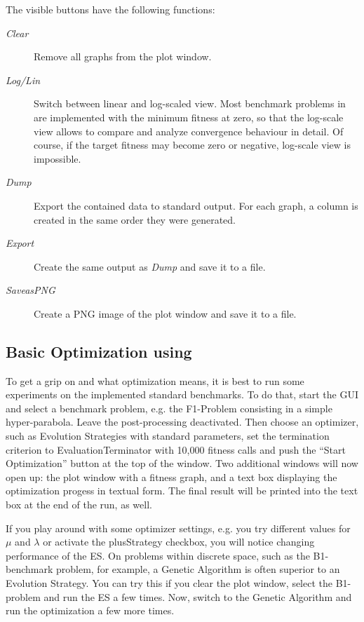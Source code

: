 The visible buttons have the following functions:
\begin{description}
\item [{\emph{Clear}}] Remove all graphs from the plot window.
\item [{\textit{Log/Lin}}] Switch between linear and log-scaled view. Most
benchmark problems in  are implemented with the minimum
fitness at zero, so that the log-scale view allows to compare and
analyze convergence behaviour in detail. Of course, if the target
fitness may become zero or negative, log-scale view is impossible.
\item [{\textit{Dump}}] Export the contained data to standard output. For
each graph, a column is created in the same order they were generated.
\item [{\textit{Export}}] Create the same output as \textit{Dump} and save
it to a file.
\item [{\textit{Save}\noun{~}\textit{as}\noun{~}\textit{PNG}}] Create
a PNG image of the plot window and save it to a file.
\end{description}

\subsection{Basic Optimization using \label{sub:Basic-Optimization-GUI}}

To get a grip on  and what optimization means, it is best
to run some experiments on the implemented standard benchmarks. To
do that, start the GUI and select a benchmark problem, e.g. the F1-Problem
consisting in a simple hyper-parabola. Leave the post-processing deactivated.
Then choose an optimizer, such as Evolution Strategies with standard
parameters, set the termination criterion to EvaluationTerminator
with 10,000 fitness calls and push the ``Start Optimization'' button
at the top of the window. Two additional windows will now open up:
the plot window with a fitness graph, and a text box displaying the
optimization progess in textual form. The final result will be printed
into the text box at the end of the run, as well.

If you play around with some optimizer settings, e.g. you try different
values for $\mu$ and $\lambda$ or activate the plusStrategy checkbox,
you will notice changing performance of the ES. On problems within
discrete space, such as the B1-benchmark problem, for example, a Genetic
Algorithm is often superior to an Evolution Strategy. You can try
this if you clear the plot window, select the B1-problem and run the
ES a few times. Now, switch to the Genetic Algorithm and run the optimization
a few more times.

